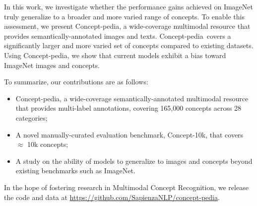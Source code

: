 \documentclass[11pt]{article}
\newcommand{\resource}{Concept-pedia}
\newcommand{\benchmark}{Concept-10k}
\begin{document}
In this work, we investigate whether the performance gains achieved on ImageNet truly generalize to a broader and more varied range of concepts.
To enable this assessment, we present \resource, a wide-coverage multimodal resource that provides semantically-annotated images and texts.
\resource~covers a significantly larger and more varied set of concepts compared to existing datasets. 
Using \resource, we show that current models exhibit a bias toward ImageNet images and concepts.

To summarize, our contributions are as follows:
\begin{itemize}

    \item \resource, a wide-coverage semantically-annotated multimodal resource that provides multi-label annotations, covering 165,000 concepts across 28 categories;
    \item A novel manually-curated evaluation benchmark, \benchmark, that covers 
    $\approx$ 10k concepts;
    \item A study on the ability of models to generalize to images and concepts beyond existing benchmarks such as ImageNet.
\end{itemize}
\noindent In the hope of fostering research in Multimodal Concept Recognition, we release the code and data at  \url{https://github.com/SapienzaNLP/concept-pedia}.
%
\end{document}
